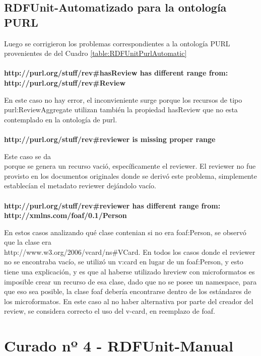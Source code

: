 \subsection{RDFUnit-Automatizado para la ontología PURL}
Luego se corrigieron los problemas correspondientes a la ontología PURL provenientes de del Cuadro \ref{table:RDFUnitPurlAutomatic}
\\\\
\textbf{http://purl.org/stuff/rev\#hasReview has different range from:\\\noindent http://purl.org/stuff/rev\#Review }

En este caso no hay error, el inconvieniente surge porque los recursos de tipo purl:ReviewAggregate utilizan también la propiedad hasReview
que no esta contemplado en la ontología de purl.
\\\\
\textbf{http://purl.org/stuff/rev\#reviewer is missing proper range}

Este caso se da \\\noindent porque se genera un recurso vació, específicamente el reviewer. El reviewer no fue provisto en los documentos originales donde 
se derivó este problema, simplemente establecían el metadato reviewer dejándolo vacío.
\\\\
\textbf{http://purl.org/stuff/rev\#reviewer has different range from:\\\noindent http://xmlns.com/foaf/0.1/Person}

En estos casos analizando qué clase contenian si no era foaf:Person, se observó que la clase era \\\noindent http://www.w3.org/2006/vcard/ns\#VCard.
En todos los casos donde el reviewer no se encontraba vacío, se utilizó un v:card en lugar de un foaf:Person, y esto tiene una explicación, 
y es que al haberse utilizado hreview con microformatos es imposible crear un recurso de esa clase, dado que no se posee un namespace, para que 
eso sea posible, la clase foaf debería encontrarse dentro de los estándares de los microformatos. 
En este caso al no haber alternativa por parte del creador del review, se considera correcto el uso del v-card, en reemplazo de foaf.

\section{Curado nº 4 - RDFUnit-Manual}
\label{section:curado-manual}

